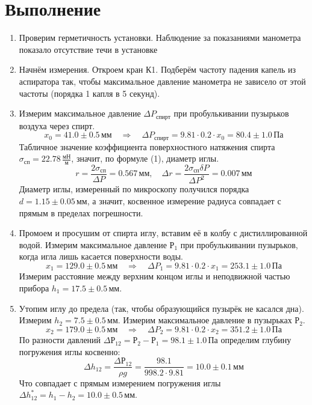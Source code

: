 \documentclass[a4paper,12pt]{article}
\begin{document}
	\section{Выполнение}
	\begin{enumerate}
		\item Проверим герметичность установки. Наблюдение за показаниями манометра показало отсутствие течи в установке 
		
		\item Начнём измерения. Откроем кран К1. Подберём частоту падения капель из аспиратора так, чтобы максимальное давление манометра не зависело от этой частоты (порядка 1 капля в 5 секунд).
		
		\item Измерим максимальное давление $\Delta P_{спирт}$  при  пробулькивании пузырьков воздуха через спирт. 
		$$x_0 = 41.0 \pm 0.5 \, мм \quad \Rightarrow \quad \Delta P_{спирт} = 9.81\cdot0.2\cdot x_0 = 80.4 \pm 1.0 \, Па$$
		Табличное значение коэффициента поверхностного натяжения спирта $\sigma_{сп} = 22.78 \, \frac{мН}{м}$, значит, по формуле (1), диаметр иглы. 
		$$ r = \dfrac{2\sigma_{сп}}{\Delta P} = 0.567\, мм, \quad \Delta r = \dfrac{2\sigma_{сп}\delta P}{\Delta P^2} = 0.007 \, мм$$
		Диаметр иглы, измеренный по микроскопу получился порядка $d = 1.15 \pm 0.05 \, мм$, а значит, косвенное измерение радиуса совпадает с прямым в пределах погрешности.
		
		\item Промоем и просушим от спирта иглу, вставим её в колбу с дистиллированной водой. Измерим максимальное давление $Р_1$ при пробулькивании пузырьков, когда игла лишь касается поверхности воды.  
		$$x_1 = 129.0 \pm 0.5 \, мм \quad \Rightarrow \quad \Delta P_1 = 9.81\cdot0.2\cdot x_1 = 253.1 \pm 1.0 \, Па$$
		Измерим расстояние между верхним концом иглы и неподвижной частью прибора $h_1 = 17.5 \pm 0.5 \, мм$.
		
		\item Утопим иглу до предела (так, чтобы образующийся пузырёк не касался дна). Измерим $h_2 = 7.5 \pm 0.5 \, мм$.
		Измерим максимальное давление в пузырьках $Р_2$.
		$$x_2 = 179.0 \pm 0.5 \, мм \quad \Rightarrow \quad \Delta P_2 = 9.81\cdot0.2\cdot x_2 = 351.2 \pm 1.0 \, Па$$
		По разности давлений $\Delta Р_{12} = Р_2 - Р_1 = 98.1 \pm 1.0 \, Па$ определим глубину погружения иглы косвенно:
		$$\Delta h_{12} = \dfrac{\Delta Р_{12}}{\rho g} = \dfrac{98.1}{998.2\cdot9.81} = 10.0\pm0.1 \, мм$$ 
		Что совпадает с прямым измерением погружения иглы $\Delta h_{12}^{*} = h_1- h_2 = 10.0 \pm 0.5 \, мм$. 
		

\end{enumerate}
\end{document}
